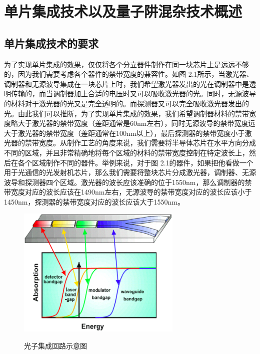 \documentclass[oneside]{ZJUthesis}
\begin{document}
\chapter{单片集成技术以及量子阱混杂技术概述}

\section{单片集成技术的要求}

为了实现单片集成的效果，仅仅将各个分立器件制作在同一块芯片上是远远不够的，因为我们需要考虑各个器件的禁带宽度的兼容性。如图 2.1所示，当激光器、调制器和无源波导集成在一块芯片上时，我们希望激光器发出的光在调制器中是透明传输的，而当调制器加上合适的电压时又可以吸收激光器的光。同时，无源波导的材料对于激光器的光又是完全透明的。而探测器又可以完全吸收激光器发出的光。由此我们可以推断，为了实现单片集成的效果，我们希望调制器材料的禁带宽度略大于激光器的禁带宽度（差距通常是60nm左右），同时无源波导的禁带宽度远大于激光器的禁带宽度（差距通常在100nm以上），最后探测器的禁带宽度小于激光器的禁带宽度。从制作工艺的角度来说，我们需要将半导体芯片在水平方向分成不同的区域，并且非常精确地将每个区域的材料的禁带宽度控制在特定波长上，然后在各个区域制作不同的器件。举例来说，对于图 2.1的器件，如果把他看做一个用于光通信的光发射机芯片，那么我们需要将整块芯片分成激光器，调制器、无源波导和探测器四个区域。激光器的波长应该准确的位于1550nm，那么调制器的禁带宽度对应的波长应该在1490nm左右，无源波导的禁带宽度对应的波长应该小于1450nm，探测器的禁带宽度对应的波长应该大于1550nm。

\begin{figure}[!h]
  \centering
  \includegraphics[width=0.7\textwidth]{./Pictures/pic.eps}\\
  \caption{光子集成回路示意图}
  \label{fig_pic}
\end{figure}
\end{document}
